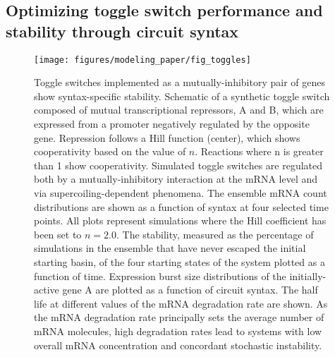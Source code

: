 \documentclass[11pt]{article} %
\begin{document}
\subsection{Optimizing toggle switch performance and stability through circuit syntax}
\begin{figure}[htbp]
    \centering
    {\texttt{[image: figures/modeling\_paper/fig\_toggles]}
    \label{fig:toggle_cartoon}
    \label{fig:toggle_basin_stability_over_time}
    \label{fig:toggle_stable_frac_n_2.0}
    \label{fig:toggle_burst_size}
    \label{fig:toggle_half_life_vs_mRNA_deg}
    }
\end{figure}
\begin{figure}[htbp]
    \ContinuedFloat
    \caption{Toggle switches implemented as a mutually-inhibitory pair of genes show syntax-specific stability.
     Schematic of a synthetic toggle switch composed of mutual transcriptional repressors, A and B, which are expressed from a promoter negatively regulated by the opposite gene. Repression follows a Hill function (center), which shows cooperativity based on the value of \(n\). Reactions where n is greater than 1 show cooperativity. Simulated toggle switches are regulated both by a mutually-inhibitory interaction at the mRNA level and via supercoiling-dependent phenomena.
     The ensemble mRNA count distributions are shown as a function of syntax at four selected time points.   All plots represent simulations where the Hill coefficient has been set to \(n = 2.0\).
     The stability, measured as the percentage of simulations in the ensemble that have never escaped the initial starting basin, of the four starting states of the system plotted as a function of time. 
     Expression burst size distributions of the initially-active gene A are plotted as a function of circuit syntax. 
     The half life at different values of the mRNA degradation rate are shown. As the mRNA degradation rate principally sets the average number of mRNA molecules, high degradation rates lead to systems with low overall mRNA concentration and concordant stochastic instability.
} \label{fig:top:toggle_switch}
\end{figure}
\end{document}
